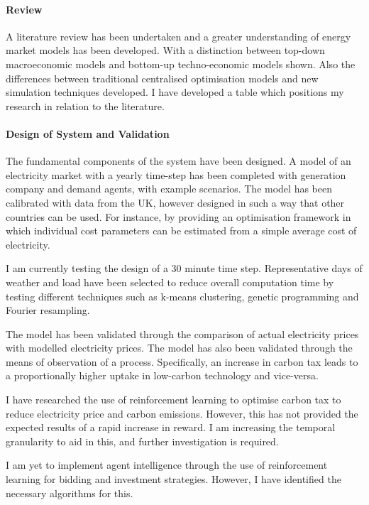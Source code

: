 \documentclass[12pt]{article}
\begin{document}
\paragraph{Review}

A literature review has been undertaken and a greater understanding of energy market models has been developed. With a distinction between top-down macroeconomic models and bottom-up techno-economic models shown. Also the differences between traditional centralised optimisation  models and new simulation techniques developed. I have developed a table which positions my research in relation to the literature.

\paragraph{Design of System and Validation}

The fundamental components of the system have been designed. A model of an electricity market with a yearly time-step has been completed with generation company and demand agents, with example scenarios. The model has been calibrated with data from the UK, however designed in such a way that other countries can be used. For instance, by providing an optimisation framework in which individual cost parameters can be estimated from a simple average cost of electricity.

I am currently testing the design of a 30 minute time step. Representative days of weather and load have been selected to reduce overall computation time by testing different techniques such as k-means clustering, genetic programming and Fourier resampling. 

The model has been validated through the comparison of actual electricity prices with modelled electricity prices. The model has also been validated through the means of observation of a process. Specifically, an increase in carbon tax leads to a proportionally higher uptake in low-carbon technology and vice-versa.

I have researched the use of reinforcement learning to optimise carbon tax to reduce electricity price and carbon emissions. However, this has not provided the expected results of a rapid increase in reward. I am increasing the temporal granularity to aid in this, and further investigation is required.

I am yet to implement agent intelligence through the use of reinforcement learning for bidding and investment strategies. However, I have identified the necessary algorithms for this.
\end{document}
